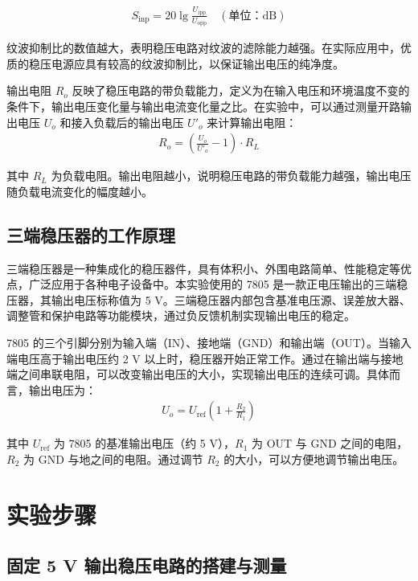 ﻿\documentclass[12pt,a4paper]{article}
\begin{document}
\begin{align}
S_{\text{inp}} = 20 \lg \frac{U_{\text{ipp}}}{U_{\text{opp}}} \quad (\text{单位：dB})
\end{align}

纹波抑制比的数值越大，表明稳压电路对纹波的滤除能力越强。在实际应用中，优质的稳压电源应具有较高的纹波抑制比，以保证输出电压的纯净度。

输出电阻 $R_o$ 反映了稳压电路的带负载能力，定义为在输入电压和环境温度不变的条件下，输出电压变化量与输出电流变化量之比。在实验中，可以通过测量开路输出电压 $U_o$ 和接入负载后的输出电压 $U'_o$ 来计算输出电阻：
\begin{align}
R_o = \left(\frac{U_o}{U'_o} - 1\right) \cdot R_L
\end{align}

其中 $R_L$ 为负载电阻。输出电阻越小，说明稳压电路的带负载能力越强，输出电压随负载电流变化的幅度越小。

\subsection{三端稳压器的工作原理}

三端稳压器是一种集成化的稳压器件，具有体积小、外围电路简单、性能稳定等优点，广泛应用于各种电子设备中。本实验使用的 7805 是一款正电压输出的三端稳压器，其输出电压标称值为 5 V。三端稳压器内部包含基准电压源、误差放大器、调整管和保护电路等功能模块，通过负反馈机制实现输出电压的稳定。

7805 的三个引脚分别为输入端（IN）、接地端（GND）和输出端（OUT）。当输入端电压高于输出电压约 2 V 以上时，稳压器开始正常工作。通过在输出端与接地端之间串联电阻，可以改变输出电压的大小，实现输出电压的连续可调。具体而言，输出电压为：
\begin{align}
U_o = U_{\text{ref}} \left(1 + \frac{R_2}{R_1}\right)
\end{align}

其中 $U_{\text{ref}}$ 为 7805 的基准输出电压（约 5 V），$R_1$ 为 OUT 与 GND 之间的电阻，$R_2$ 为 GND 与地之间的电阻。通过调节 $R_2$ 的大小，可以方便地调节输出电压。

\section{实验步骤}

\subsection{固定 5 V 输出稳压电路的搭建与测量}
\end{document}
